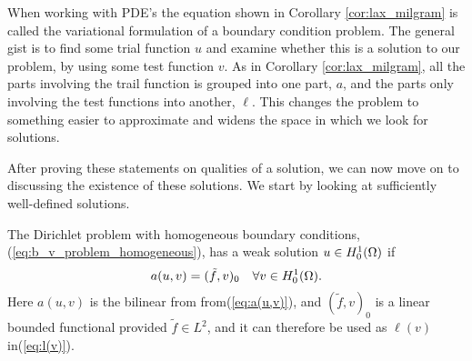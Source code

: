 When working with PDE's the equation shown in Corollary \ref{cor:lax_milgram} 
is called the variational formulation of a boundary condition problem. 
The general gist is to find some trial function $u$ and examine whether this 
is a solution to our problem, by using some test function $v$. 
As in Corollary \ref{cor:lax_milgram}, all the parts involving the trail function 
is grouped into one part, $a$, and the parts only involving the test functions into 
another, $\ell$.
This changes the problem to something easier to approximate and widens the 
space in which we look for solutions.

After proving these statements on qualities of a solution, we can now move 
on to discussing the existence of these solutions. We start by looking at 
sufficiently well-defined solutions. 
\begin{defn}{\quad}
    The Dirichlet problem with homogeneous boundary conditions,
     (\ref{eq:b_v_problem_homogeneous}), has a weak solution $u\in H_0^1(\Omega)$
     if 
     \begin{equation*}
        a(u,v) = (\tilde{f},v)_0 \quad \forall v \in H_0^1(\Omega).
     \end{equation*}
     Here $a(u,v)$ is the bilinear from from(\ref{eq:a(u,v)}), 
     and $(\tilde{f},v)_0$ is a linear bounded functional provided $\tilde{f}\in L^2$, and it can therefore be used as $\ell(v)$ in(\ref{eq:l(v)}).
\end{defn}





